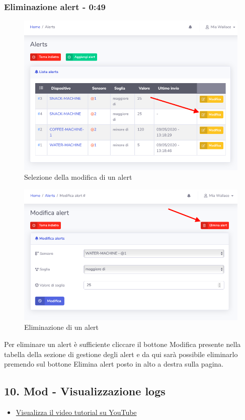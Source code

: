 	\subsubsection{Eliminazione alert - 0:49}
	\begin{figure}[H]
		\centering
		\includegraphics[scale=0.600]{res/images/mod/selModAlert.png}
		\caption{Selezione della modifica di un alert}
	\end{figure}
	\begin{figure}[H]
		\centering
		\includegraphics[scale=0.600]{res/images/mod/elimAlert.png}
		\caption{Eliminazione di un alert}
	\end{figure}
	Per eliminare un alert è sufficiente cliccare il bottone Modifica presente nella tabella della sezione di gestione degli alert e da qui sarà possibile eliminarlo premendo sul bottone Elimina alert posto in alto a destra sulla pagina.
	

\newpage \subsection{10. Mod - Visualizzazione logs}
	\begin{itemize}
		\item \href{https://www.youtube.com/watch?v=PjySMOLCtMA&list=PLPKYjnuIh1FA3b3jn_bwY_ztYzaFn2mIT&index=13}{Visualizza il video tutorial su YouTube} 
	\end{itemize}
